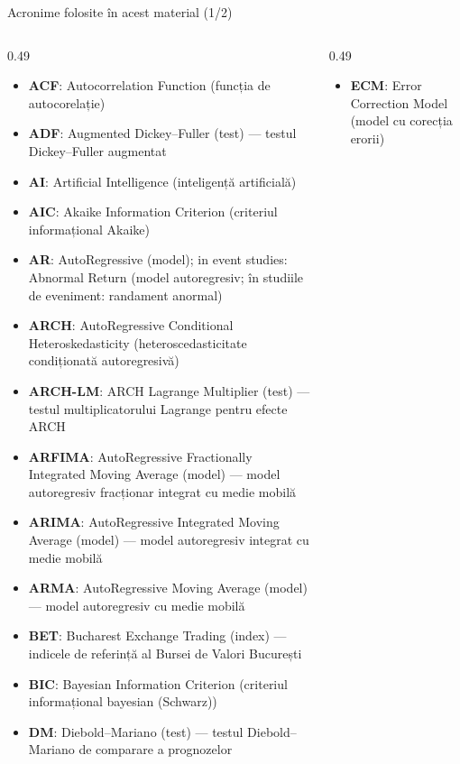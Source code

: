 \begin{frame}{Acronime folosite în acest material (1/2)}
\begin{columns}[T]
\begin{column}{0.49\textwidth}
\begin{itemize}\setlength{\itemsep}{0pt}
    \item \textbf{ACF}: Autocorrelation Function (funcția de autocorelație)
    \item \textbf{ADF}: Augmented Dickey–Fuller (test) — testul Dickey–Fuller augmentat
    \item \textbf{AI}: Artificial Intelligence (inteligență artificială)
    \item \textbf{AIC}: Akaike Information Criterion (criteriul informațional Akaike)
    \item \textbf{AR}: AutoRegressive (model); in event studies: Abnormal Return (model autoregresiv; în studiile de eveniment: randament anormal)
    \item \textbf{ARCH}: AutoRegressive Conditional Heteroskedasticity (heteroscedasticitate condiționată autoregresivă)
    \item \textbf{ARCH-LM}: ARCH Lagrange Multiplier (test) — testul multiplicatorului Lagrange pentru efecte ARCH
    \item \textbf{ARFIMA}: AutoRegressive Fractionally Integrated Moving Average (model) — model autoregresiv fracționar integrat cu medie mobilă
    \item \textbf{ARIMA}: AutoRegressive Integrated Moving Average (model) — model autoregresiv integrat cu medie mobilă
    \item \textbf{ARMA}: AutoRegressive Moving Average (model) — model autoregresiv cu medie mobilă
    \item \textbf{BET}: Bucharest Exchange Trading (index) — indicele de referință al Bursei de Valori București
    \item \textbf{BIC}: Bayesian Information Criterion (criteriul informațional bayesian (Schwarz))
    \item \textbf{DM}: Diebold–Mariano (test) — testul Diebold–Mariano de comparare a prognozelor
\end{itemize}
\end{column}
\begin{column}{0.49\textwidth}
\begin{itemize}\setlength{\itemsep}{0pt}
    \item \textbf{ECM}: Error Correction Model (model cu corecția erorii)

\end{itemize}
\end{column}
\end{columns}
\end{frame}

